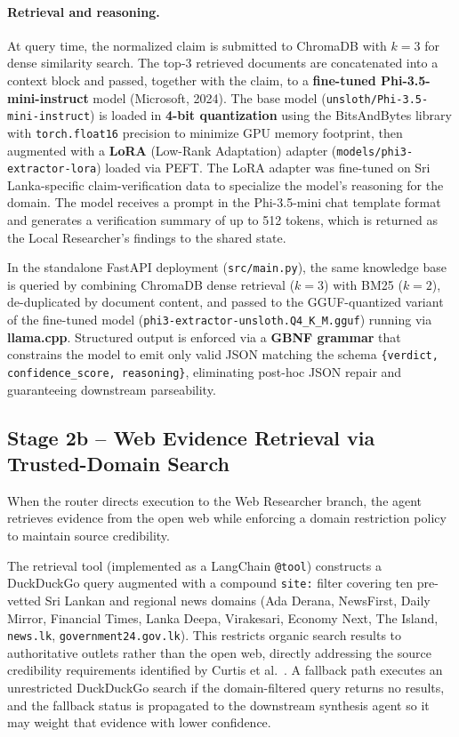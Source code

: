 \documentclass[12pt,a4paper]{article}
\begin{document}
\paragraph{Retrieval and reasoning.}
At query time, the normalized claim is submitted to ChromaDB with $k{=}3$
for dense similarity search. The top-3 retrieved documents are concatenated
into a context block and passed, together with the claim, to a
\textbf{fine-tuned Phi-3.5-mini-instruct} model (Microsoft, 2024). The base model
(\texttt{unsloth/Phi-3.5-mini-instruct}) is loaded in \textbf{4-bit
quantization} using the BitsAndBytes library with \texttt{torch.float16}
precision to minimize GPU memory footprint, then augmented with a
\textbf{LoRA} (Low-Rank Adaptation) adapter
(\texttt{models/phi3-extractor-lora}) loaded via PEFT. The LoRA adapter was
fine-tuned on Sri Lanka-specific claim-verification data to specialize the
model's reasoning for the domain. The model receives a prompt in the
Phi-3.5-mini chat template format and generates a verification
summary of up to 512 tokens, which is returned as the Local Researcher's
findings to the shared state.

In the standalone FastAPI deployment (\texttt{src/main.py}), the same
knowledge base is queried by combining ChromaDB dense retrieval ($k{=}3$)
with BM25 ($k{=}2$), de-duplicated by document content, and passed to the
GGUF-quantized variant of the fine-tuned model (\texttt{phi3-extractor-unsloth.Q4\_K\_M.gguf})
running via \textbf{llama.cpp}. Structured output is enforced via a
\textbf{GBNF grammar} that constrains the model to emit only valid JSON
matching the schema \texttt{\{verdict, confidence\_score, reasoning\}},
eliminating post-hoc JSON repair and guaranteeing downstream parseability.

\subsection{Stage 2b -- Web Evidence Retrieval via Trusted-Domain Search}
\label{subsec:web-retrieval}

When the router directs execution to the Web Researcher branch, the agent
retrieves evidence from the open web while enforcing a domain restriction
policy to maintain source credibility.

The retrieval tool (implemented as a LangChain \texttt{@tool}) constructs a
DuckDuckGo query augmented with a compound \texttt{site:} filter covering
ten pre-vetted Sri Lankan and regional news domains (Ada Derana, NewsFirst,
Daily Mirror, Financial Times, Lanka Deepa, Virakesari, Economy Next, The
Island, \texttt{news.lk}, \texttt{government24.gov.lk}). This restricts
organic search results to authoritative outlets rather than the open web,
directly addressing the source credibility requirements identified by
Curtis et al.~\cite{veracity}. A fallback path executes an unrestricted
DuckDuckGo search if the domain-filtered query returns no results, and the
fallback status is propagated to the downstream synthesis agent so it may
weight that evidence with lower confidence.
\end{document}
